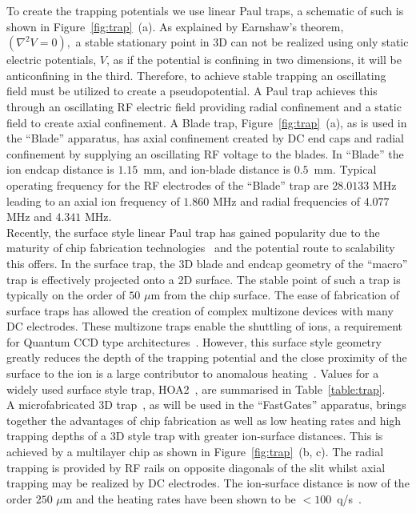 \documentclass[12pt]{iopart}
\begin{document}
To create the trapping potentials we use linear
Paul traps, a schematic of such is shown in
Figure~\ref{fig:trap}~(a). As explained by Earnshaw's theorem,
$(\nabla^2 V = 0),$
a stable stationary point in 3D can not be realized using only static
electric potentials, $V$, as if the potential is confining in two
dimensions, it will be anticonfining in the third. Therefore, to
achieve stable trapping an oscillating field must be utilized to
create a pseudopotential.
A Paul trap achieves this through an oscillating RF electric field
providing radial confinement and a static field to create axial
confinement.
A Blade trap, Figure~\ref{fig:trap}~(a), as is used in the ``Blade''
apparatus, has axial confinement created by DC end caps and radial
confinement by supplying an oscillating RF voltage to the blades. In
``Blade'' the ion endcap distance is $1.15$~mm, and ion-blade distance
is $0.5$~mm. Typical operating frequency for the RF electrodes of the
``Blade'' trap are $28.0133$ MHz leading to an axial ion frequency of
$1.860$ MHz and radial frequencies of $4.077$ MHz and $4.341$
MHz.\\ Recently, the surface style linear Paul trap has gained
popularity due to the maturity of chip fabrication technologies~\cite{allcock_surface-electrode_2011}
and the potential route to scalability this offers. In the surface
trap, the 3D blade and endcap geometry of the ``macro'' trap is
effectively projected onto a 2D surface. The stable point of such a
trap is typically on the order of $50$ $\mu$m from the chip
surface. The ease of fabrication of surface traps has allowed the
creation of complex multizone devices with many DC electrodes.  These
multizone traps enable the shuttling of ions, a requirement for
Quantum CCD type architectures~\cite{kielpinski_architecture_2002}. However, this surface style
geometry greatly reduces the depth of the trapping potential and the
close proximity of the surface to the ion is a large contributor to
anomalous heating~\cite{turchette_heating_2000}. Values for a widely used surface style trap,
HOA2~\cite{maunz_high_2016}, are summarised in
Table~\ref{table:trap}.\\ A microfabricated 3D
trap~\cite{see_fabrication_2013, wilpers_monolithic_2012}, as will be
used in the ``FastGates'' apparatus, brings together the advantages of
chip fabrication as well as low heating rates and high trapping depths
of a 3D style trap with greater ion-surface distances. This is
achieved by a multilayer chip as shown in Figure~\ref{fig:trap}~(b,
c). The radial trapping is provided by RF rails on opposite diagonals
of the slit whilst axial trapping may be realized by DC
electrodes. The ion-surface distance is now of the order $250$ $\mu$m
and the heating rates have been shown to be $<
100$~q/s~\cite{choonee_silicon_2017}.
\end{document}
